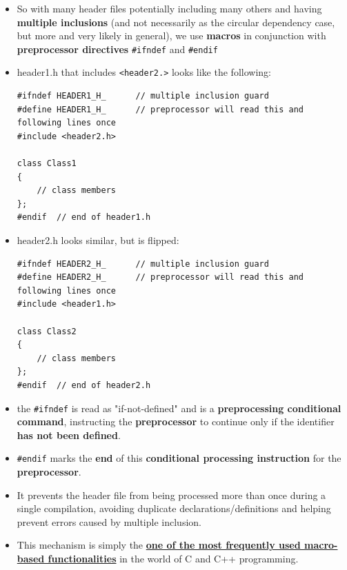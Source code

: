 \documentclass[10pt]{article}
\begin{document}
\begin{itemize}
	\item So with many header files potentially including many others and having \textbf{multiple inclusions} (and not necessarily as the circular dependency case, but more and very likely in general), we use \textbf{macros} in conjunction with \textbf{preprocessor directives} \verb|#ifndef| and  \verb|#endif|

	\item header1.h that includes \verb|<header2.>| looks like the following:
		\begin{verbatim}
#ifndef HEADER1_H_		// multiple inclusion guard
#define HEADER1_H_		// preprocessor will read this and following lines once
#include <header2.h>

class Class1 
{
	// class members
};
#endif	// end of header1.h
		\end{verbatim}

	\item header2.h looks similar, but is flipped:
		\begin{verbatim}
#ifndef HEADER2_H_		// multiple inclusion guard
#define HEADER2_H_		// preprocessor will read this and following lines once
#include <header1.h>

class Class2 
{
	// class members
};
#endif	// end of header2.h
		\end{verbatim}

	\item the \verb|#ifndef| is read as "if-not-defined" and is a \textbf{preprocessing conditional command}, instructing the \textbf{preprocessor} to continue only if the identifier \textbf{has not been defined}.

	\item \verb|#endif| marks the \textbf{end} of this \textbf{conditional processing instruction} for the \textbf{preprocessor}.

\item It prevents the header file from being processed more than once during a single compilation, avoiding duplicate declarations/definitions and helping prevent errors caused by multiple inclusion.

\item This mechanism is simply the \underline{\textbf{one of the most frequently used macro-based functionalities}} in the world of C and C++ programming.

\end{itemize}

\newpage
\end{document}
